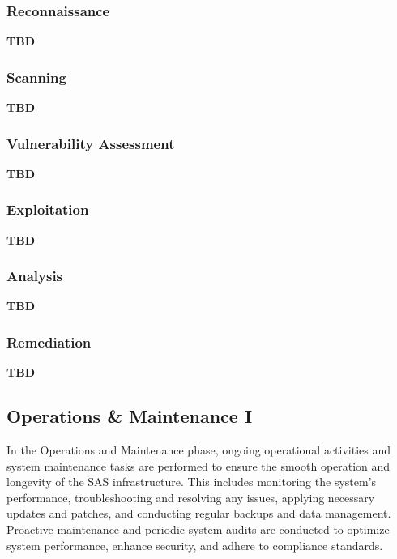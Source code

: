\subsubsection{Reconnaissance}
\textbf{TBD}
\subsubsection{Scanning}
\textbf{TBD}
\subsubsection{Vulnerability Assessment}
\textbf{TBD}
\subsubsection{Exploitation}
\textbf{TBD}
\subsubsection{Analysis}
\textbf{TBD}
\subsubsection{Remediation}
\textbf{TBD}


\subsection{Operations \& Maintenance I}

In the Operations and Maintenance phase, ongoing operational activities and system maintenance tasks are performed to ensure the smooth operation and longevity of the SAS infrastructure. This includes monitoring the system's performance, troubleshooting and resolving any issues, applying necessary updates and patches, and conducting regular backups and data management. Proactive maintenance and periodic system audits are conducted to optimize system performance, enhance security, and adhere to compliance standards.